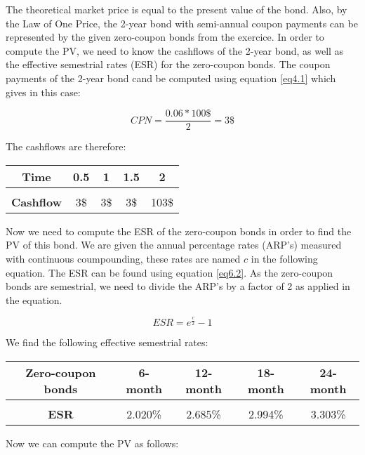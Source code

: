 \documentclass[a4paper,11pt,twoside]{article}
\begin{document}
The theoretical market price is equal to the present value of the bond. Also, by the Law of One Price, the 2-year bond with semi-annual coupon payments can be represented by the given zero-coupon bonds from the exercice. In order to compute the PV, we need to know the cashflows of the 2-year bond, as well as the effective semestrial rates (ESR) for the zero-coupon bonds. The coupon payments of the 2-year bond cand be computed using equation \ref{eq4.1} which gives in this case:

\begin{equation}
\label{eq6.1}
CPN = \frac{0.06*100\$}{2} = 3\$
\end{equation}

The cashflows are therefore:

\begin{center} 
\begin{tabular} { c  c  c  c  c }
\textbf{Time} & 0.5 & 1 & 1.5 & 2 \\
\hline \\[-7pt]
\textbf{Cashflow} & 3\$ & 3\$ & 3\$ & 103\$ \\
\end{tabular}
\end{center}

Now we need to compute the ESR of the zero-coupon bonds in order to find the PV of this bond. We are given the annual percentage rates (ARP's) measured with continuous coumpounding, these rates are named $c$ in the following equation. The ESR can be found using equation \ref{eq6.2}. As the zero-coupon bonds are semestrial, we need to divide the ARP's by a factor of 2 as applied in the equation. 

\begin{equation}
\label{eq6.2}
ESR = e^{\frac{c}{2}}-1
\end{equation}

We find the following effective semestrial rates:

\begin{center} 
\begin{tabular} { c  c  c  c  c }
\textbf{Zero-coupon bonds} & 6-month & 12-month & 18-month & 24-month \\
\hline\\[-7pt]
\textbf{ESR} & 2.020\% & 2.685\% & 2.994\% & 3.303\%\\
\hline
\end{tabular}
\end{center}

Now we can compute the PV as follows:
\end{document}
